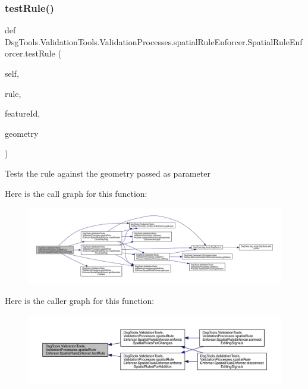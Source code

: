\subsubsection{\texorpdfstring{test\+Rule()}{testRule()}}
{\footnotesize\ttfamily def Dsg\+Tools.\+Validation\+Tools.\+Validation\+Processes.\+spatial\+Rule\+Enforcer.\+Spatial\+Rule\+Enforcer.\+test\+Rule (\begin{DoxyParamCaption}\item[{}]{self,  }\item[{}]{rule,  }\item[{}]{feature\+Id,  }\item[{}]{geometry }\end{DoxyParamCaption})}

\begin{DoxyVerb}Tests the rule against the geometry passed as parameter
\end{DoxyVerb}
 Here is the call graph for this function\+:
\nopagebreak
\begin{figure}[H]
\begin{center}
\leavevmode
\includegraphics[width=350pt]{class_dsg_tools_1_1_validation_tools_1_1_validation_processes_1_1spatial_rule_enforcer_1_1_spatial_rule_enforcer_a22b1704cb8ae1140b03a0f0377f180d4_cgraph}
\end{center}
\end{figure}
Here is the caller graph for this function\+:
\nopagebreak
\begin{figure}[H]
\begin{center}
\leavevmode
\includegraphics[width=350pt]{class_dsg_tools_1_1_validation_tools_1_1_validation_processes_1_1spatial_rule_enforcer_1_1_spatial_rule_enforcer_a22b1704cb8ae1140b03a0f0377f180d4_icgraph}
\end{center}
\end{figure}


